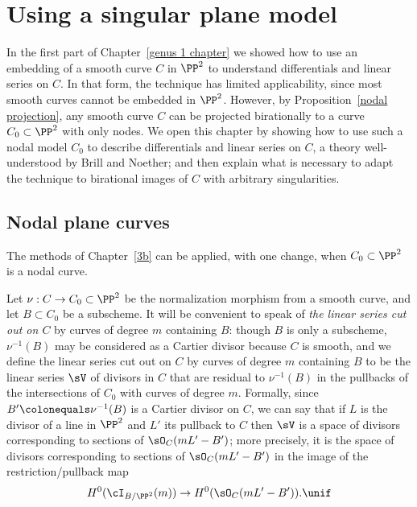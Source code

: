 
\chapter{Using a singular plane model}
\label{PlaneCurvesChapter}
\label{PlaneCurveChapter}


In the first part of Chapter~\ref{genus 1 chapter} we showed how to
use an embedding of a smooth curve $C$
in $\PP^2$ to understand differentials and linear series on $C$.
In that form,
the technique
has limited applicability,
since most smooth curves cannot be embedded in
$\PP^2$.
However, by Proposition~\ref{nodal projection},
 any smooth curve $C$ can be projected
birationally to a curve $C_0\subset\PP^2$ with only nodes.
We open this chapter by showing
how to use such a nodal model $C_0$ to describe differentials and
linear series on $C$, a theory well-understood
by Brill and Noether;  and then explain
what is necessary to adapt the technique to birational images of $C$
with arbitrary singularities.

\section{Nodal plane curves}\label{nodal curves section}

The methods of Chapter~\ref{3b}
 can be applied, with one change, when $C_{0}\subset \PP^{2}$
%
is a nodal curve.

Let $\nu: C\to C_{0}\subset \PP^{2}$ be the
%
normalization morphism from a smooth curve,
and let $B\subset C_{0}$ be a subscheme.
It will be convenient to speak of
%
\emph{the linear series cut out on $C$} by curves of degree $m$
containing $B$: though $B$ is only a subscheme, $\nu^{-1}(B)$ may be
considered as a
Cartier divisor
%
 because
$C$ is smooth, and we define
the linear series cut out on $C$ by curves of degree $m$
containing $B$ to be
the linear series  $\sV$ of divisors in $C$ that are residual to $\nu^{-1}(B)$ in the pullbacks
of the intersections of $C_{0}$ with curves of degree $m$.
Formally, since $B' \colonequals  \nu^{-1}(B)$
is a Cartier divisor on $C$, we can say that if $L$ is the divisor of a line in $\PP^{2}$ and $L'$
its pullback to $C$ then
$\sV$ is a space of divisors corresponding to
sections of $\sO_{C}(mL'-B')$; more precisely, it is the space of divisors corresponding to
sections of $\sO_{C}(mL'-B')$ in the image of the restriction/pullback map
$$
H^0(\cI_{B/\PP^2}(m)) \to H^0(\sO_{C}(mL'-B')).
\unif
$$

